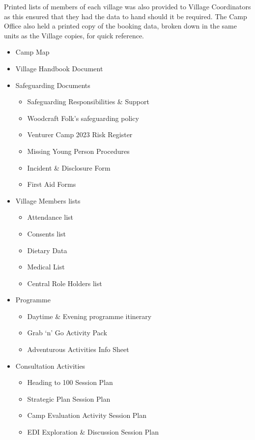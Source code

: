 Printed lists of members of each village was also provided to Village Coordinators as this ensured that they had the data to hand should it be required. The Camp Office also held a printed copy of the booking data, broken down in the same units as the Village copies, for quick reference.
\begin{itemize}
    \item Camp Map
    \item Village Handbook Document
    \item Safeguarding Documents
    \begin{itemize}
        \item Safeguarding Responsibilities \& Support
        \item Woodcraft Folk's safeguarding policy
        \item Venturer Camp 2023 Risk Register
        \item Missing Young Person Procedures
        \item Incident \& Disclosure Form
        \item First Aid Forms
    \end{itemize}
    \item Village Members lists
    \begin{itemize}
        \item Attendance list
        \item Consents list
        \item Dietary Data
        \item Medical List
        \item Central Role Holders list
    \end{itemize}
    \item Programme
    \begin{itemize}
        \item Daytime \& Evening programme itinerary
        \item Grab `n' Go Activity Pack
        \item Adventurous Activities Info Sheet
    \end{itemize}
    \item Consultation Activities
    \begin{itemize}
        \item Heading to 100 Session Plan
        \item Strategic Plan Session Plan
        \item Camp Evaluation Activity Session Plan
        \item EDI Exploration \& Discussion Session Plan
    \end{itemize} 
\end{itemize}

